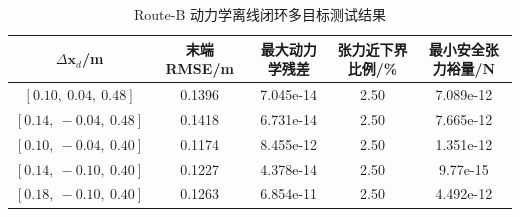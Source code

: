 \begin{table}[htbp]
  \centering
  \caption{Route-B 动力学离线闭环多目标测试结果}
  \label{tab:routeB_table3_2_selected}
  \begin{tabular}{ccccc}
    \toprule
    $\Delta \mathbf{x}_d$/m & 末端 RMSE/m & 最大动力学残差 & 张力近下界比例/\% & 最小安全张力裕量/N \\
    \midrule
    $[0.10,\ 0.04,\ 0.48]$ & 0.1396 & 7.045e-14 & 2.50 & 7.089e-12 \\
    $[0.14,\ -0.04,\ 0.48]$ & 0.1418 & 6.731e-14 & 2.50 & 7.665e-12 \\
    $[0.10,\ -0.04,\ 0.40]$ & 0.1174 & 8.455e-12 & 2.50 & 1.351e-12 \\
    $[0.14,\ -0.10,\ 0.40]$ & 0.1227 & 4.378e-14 & 2.50 & 9.77e-15 \\
    $[0.18,\ -0.10,\ 0.40]$ & 0.1263 & 6.854e-11 & 2.50 & 4.492e-12 \\
    \bottomrule
  \end{tabular}
\end{table}
